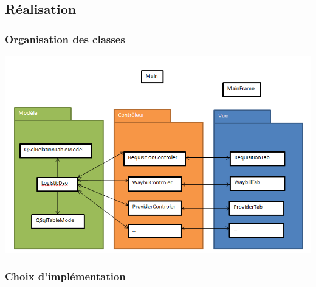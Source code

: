 \subsection{Réalisation}
	\begin{frame}
		\frametitle{Organisation des classes}
		\begin{center}
			\includegraphics[scale=0.3]{Images/OrganisationClasses}
		\end{center}
	\end{frame}
	\begin{frame}
		\frametitle{Choix d'implémentation}
	\end{frame}